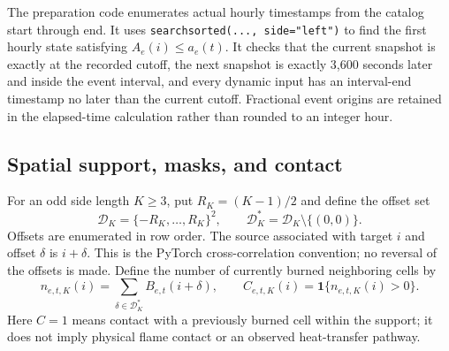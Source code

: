 \documentclass[11pt,a4paper]{article}
\newcommand{\Ind}{\mathbf{1}}
\begin{document}
The preparation code enumerates actual hourly timestamps from the catalog
start through end. It uses \texttt{searchsorted(..., side="left")} to find the
first hourly state satisfying $A_e(i)\leq a_e(t)$. It checks that the current
snapshot is exactly at the recorded cutoff, the next snapshot is exactly
3,600 seconds later and inside the event interval, and every dynamic input
has an interval-end timestamp no later than the current cutoff. Fractional
event origins are retained in the elapsed-time calculation rather than
rounded to an integer hour.

\subsection{Spatial support, masks, and contact}

For an odd side length $K\geq3$, put $R_K=(K-1)/2$ and define the offset set
\begin{equation}
 \mathcal D_K=\{-R_K,\ldots,R_K\}^{2},\qquad
 \mathcal D_K^*=\mathcal D_K\setminus\{(0,0)\}.
\end{equation}
Offsets are enumerated in row order. The source associated with target $i$
and offset $\delta$ is $i+\delta$. This is the PyTorch cross-correlation
convention; no reversal of the offsets is made. Define the number of currently
burned neighboring cells by
\begin{equation}
 n_{e,t,K}(i)=\sum_{\delta\in\mathcal D_K^*}B_{e,t}(i+\delta),
 \qquad C_{e,t,K}(i)=\Ind\{n_{e,t,K}(i)>0\}.
 \label{eq:prob-contact}
\end{equation}
Here $C=1$ means contact with a previously burned cell within the support; it
does not imply physical flame contact or an observed heat-transfer pathway.
\end{document}
